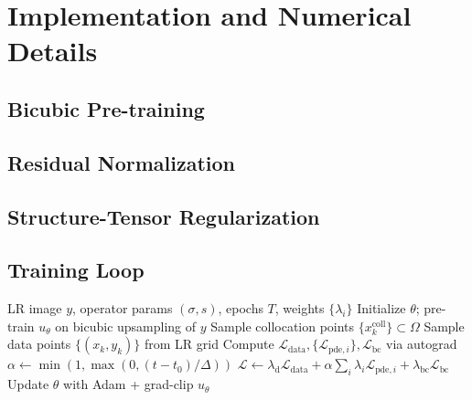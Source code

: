 \documentclass[conference]{IEEEtran}
\newcommand{\grad}{\nabla}
\newcommand{\divg}{\mathrm{div}}
\newcommand{\loss}{\mathcal{L}}
\newcommand{\net}{u_{\theta}}
\begin{document}
\section{Implementation and Numerical Details}

\subsection{Bicubic Pre-training}

\subsection{Residual Normalization}

\subsection{Structure-Tensor Regularization}

\subsection{Training Loop}

\begin{algorithm}[t]
\caption{PINN Super-Resolution Training}
\label{alg:train}
\begin{algorithmic}[1]
\REQUIRE LR image $y$, operator params $(\sigma, s)$, epochs $T$, weights $\{\lambda_i\}$
\STATE Initialize $\theta$; pre-train $\net$ on bicubic upsampling of $y$
    \STATE Sample collocation points $\{x_k^{\text{coll}}\} \subset \Omega$
    \STATE Sample data points $\{(x_k, y_k)\}$ from LR grid
    \STATE Compute $\loss_{\text{data}}, \{\loss_{\text{pde},i}\}, \loss_{\text{bc}}$ via autograd
    \STATE $\alpha \leftarrow \min(1, \max(0, (t - t_0)/\Delta))$
    \STATE $\loss \leftarrow \lambda_{\text{d}} \loss_{\text{data}} + \alpha \sum_i \lambda_i \loss_{\text{pde},i} + \lambda_{\text{bc}} \loss_{\text{bc}}$
    \STATE Update $\theta$ with Adam + grad-clip
\ENDFOR
\RETURN $\net$
\end{algorithmic}
\end{algorithm}
\end{document}
